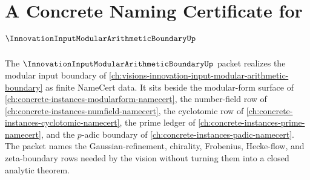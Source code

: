 \chapter{A Concrete Naming Certificate for $\InnovationInputModularArithmeticBoundaryUp$}
\label{ch:concrete-instances-innovation-input-modular-arithmetic-boundary-namecert}

The $\InnovationInputModularArithmeticBoundaryUp$ packet realizes the modular input boundary of \autoref{ch:visions-innovation-input-modular-arithmetic-boundary} as finite NameCert data. It sits beside the modular-form surface of \autoref{ch:concrete-instances-modularform-namecert}, the number-field row of \autoref{ch:concrete-instances-numfield-namecert}, the cyclotomic row of \autoref{ch:concrete-instances-cyclotomic-namecert}, the prime ledger of \autoref{ch:concrete-instances-prime-namecert}, and the $p$-adic boundary of \autoref{ch:concrete-instances-padic-namecert}. The packet names the Gaussian-refinement, chirality, Frobenius, Hecke-flow, and zeta-boundary rows needed by the vision without turning them into a closed analytic theorem.


